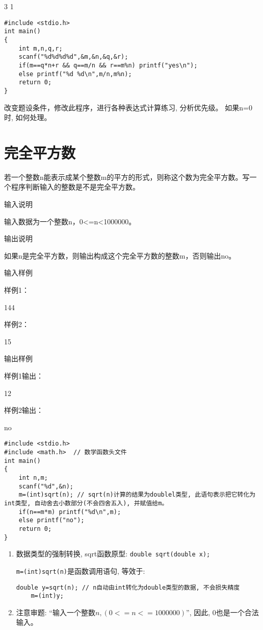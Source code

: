 3 1

\begin{lstlisting}
#include <stdio.h>
int main()
{
	int m,n,q,r;
	scanf("%d%d%d%d",&m,&n,&q,&r);
	if(m==q*n+r && q==m/n && r==m%n) printf("yes\n");
	else printf("%d %d\n",m/n,m%n); 
	return 0;
} 
\end{lstlisting}

\begin{note}
	改变题设条件，修改此程序，进行各种表达式计算练习, 分析优先级。 如果n=0时, 如何处理。
\end{note}

\section{完全平方数}
若一个整数n能表示成某个整数m的平方的形式，则称这个数为完全平方数。写一个程序判断输入的整数是不是完全平方数。

输入说明
	
输入数据为一个整数n，0<=n<1000000。

输出说明
	
如果n是完全平方数，则输出构成这个完全平方数的整数m，否则输出no。

输入样例
	
样例1：

144

样例2：

15

输出样例
	
样例1输出：

12

样例2输出：

no

\begin{lstlisting}
#include <stdio.h>
#include <math.h>  // 数学函数头文件
int main()
{
	int n,m;
	scanf("%d",&n);
	m=(int)sqrt(n); // sqrt(n)计算的结果为doublel类型, 此语句表示把它转化为int类型, 自动舍去小数部分(不会四舍五入), 并赋值给m。
	if(n==m*m) printf("%d\n",m);
	else printf("no");
	return 0;
} 
\end{lstlisting}

\begin{note}[要点]
	\begin{enumerate}
	\item 数据类型的强制转换, sqrt函数原型: \lstinline|double sqrt(double x);|
	
	\lstinline|m=(int)sqrt(n)|是函数调用语句, 等效于:
	\begin{lstlisting}[frame=none]
	double y=sqrt(n); // n自动由int转化为double类型的数据, 不会损失精度
	m=(int)y; 
	\end{lstlisting}
	\item 注意审题: ``输入一个整数$n, (0<=n<=1000000)$'', 因此, 0也是一个合法输入。
\end{enumerate}
\end{note}

